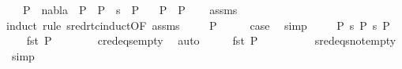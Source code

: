 \begin{isabellebody}
\ \ \ {\isachardoublequoteopen}P{}\ {\isasymturnstile}\ nabla\ {\isasymrightarrow}\ P{}{\isachardoublequoteclose}\ \ {\isachardoublequoteopen}P{}\ {\isasymturnstile}\ s\ {\isasymleadsto}\isactrlsup {\isacharasterisk}{\kern0pt}\ P{}{\isachardoublequoteclose}\isanewline
\ \ \ {\isachardoublequoteopen}P{}\ {\isacharequal}{\kern0pt}\ P{}{\isachardoublequoteclose}\isanewline
%
\isadelimproof
\ \ %
\endisadelimproof
%
\isatagproof
{}\isamarkupfalse%
\ assms\isanewline
{}\isamarkupfalse%
{\isacharparenleft}{\kern0pt}induct\ rule{\isacharcolon}{\kern0pt}\ sred{\isacharunderscore}{\kern0pt}rtc{\isachardot}{\kern0pt}induct{\isacharbrackleft}{\kern0pt}OF\ assms{\isacharparenleft}{\kern0pt}{}{\isacharparenright}{\kern0pt}{\isacharbrackright}{\kern0pt}{\isacharparenright}{\kern0pt}\isanewline
\ \ \isamarkupfalse%
\ {\isacharparenleft}{\kern0pt}{}\ P{}{\isacharparenright}{\kern0pt}\isanewline
\ \ \isamarkupfalse%
\ \isamarkupfalse%
\ {\isacharquery}{\kern0pt}case\ \isamarkupfalse%
\ simp\isanewline
{}\isamarkupfalse%
\isanewline
\ \ \isamarkupfalse%
\ {\isacharparenleft}{\kern0pt}{}\ P{}\ s{\isacharprime}{\kern0pt}\ P{\isacharprime}{\kern0pt}\ s{}\ P{}{\isacharparenright}{\kern0pt}\isanewline
\ \ \isamarkupfalse%
\ {\isachardoublequoteopen}fst\ P{}\ {\isacharequal}{\kern0pt}\ {\isacharbrackleft}{\kern0pt}{\isacharbrackright}{\kern0pt}{\isachardoublequoteclose}\isanewline
\ \ \ \ \isamarkupfalse%
\ c{\isacharunderscore}{\kern0pt}red{\isacharunderscore}{\kern0pt}eqs{\isacharunderscore}{\kern0pt}empty\ \isamarkupfalse%
\ auto\isanewline
\ \ \isamarkupfalse%
\ \isamarkupfalse%
\ {\isachardoublequoteopen}fst\ P{}\ {\isasymnoteq}\ {\isacharbrackleft}{\kern0pt}{\isacharbrackright}{\kern0pt}{\isachardoublequoteclose}\ \isanewline
\ \ \ \ \isamarkupfalse%
\ {}{\isacharparenleft}{\kern0pt}{}{\isacharparenright}{\kern0pt}\ sred{\isacharunderscore}{\kern0pt}eqs{\isacharunderscore}{\kern0pt}not{\isacharunderscore}{\kern0pt}empty\ \isamarkupfalse%
\ simp\isanewline
\ \ \isamarkupfalse%
\ \isamarkupfalse%

\end{isabellebody}
